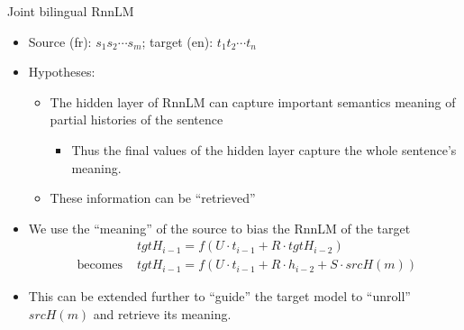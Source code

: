 \documentclass[pdf]{beamer}
\newcommand{\pc}[1]{\left( #1 \right)} %
\begin{document}
\begin{frame}{Joint bilingual RnnLM}
\begin{itemize}
\item Source (fr): $s_1 s_2 \cdots s_m$; target (en): $t_1 t_2 \cdots t_n$
\item Hypotheses:
\begin{itemize}
\item The hidden layer of RnnLM can capture important semantics meaning of partial histories of the sentence
\begin{itemize}
\item Thus the final values of the hidden layer capture the whole sentence's meaning.
\end{itemize}
\item These information can be ``retrieved''
\end{itemize}
\item We use the ``meaning'' of the source to bias the RnnLM of the target
\begin{align*}
&tgtH_{i-1} = f \pc{U \cdot t_{i-1} + R \cdot tgtH_{i-2}} \\
\text{ becomes } &tgtH_{i-1} = f \pc{U \cdot t_{i-1} + R \cdot h_{i-2} + S \cdot srcH(m)}
\end{align*}
\item This can be extended further to ``guide'' the target model to ``unroll'' $srcH(m)$ and retrieve its meaning.
\end{itemize}
\end{frame}

\end{document}
